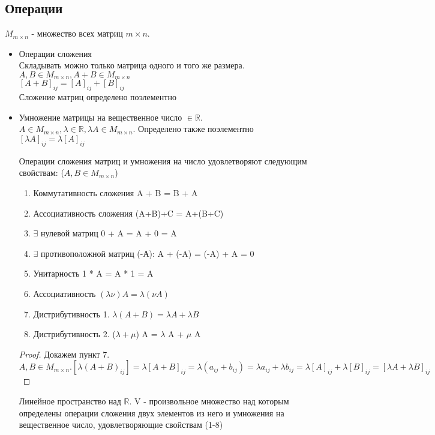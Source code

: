 	\subsection{Операции}
	\(M_{m\times n}\) - множество всех матриц \(m\times n\).
	\begin{itemize}
		\item Операции сложения \\
		Складывать можно только матрица одного и того же размера. \(A, B \in M_{m\times n}, A + B \in M_{m\times n}\)\\
		\([A+B]_{ij} = [A]_{ij}+ [B]_{ij}\)\\
		Сложение матриц определено поэлементно
		\item Умножение матрицы на вещественное число \(\in\mathbb{R}\). \(A\in M_{m\times n}, \lambda \in \mathbb{R}, \lambda A\in M_{m\times n}\). Определено также поэлементно \\
		\([\lambda A]_{ij} = \lambda[A]_{ij}\)
		\begin{theorem}
			Операции сложения матриц и умножения на число удовлетворяют следующим свойствам: (\(A, B \in M_{m\times n}\))
			\begin{enumerate}
				\item Коммутативность сложения A + B = B + A
				\item Ассоциативность сложения (A+B)+C = A+(B+C)
				\item \(\exists\) нулевой матриц 0 + A = A + 0 = A
				\item \(\exists\) противоположной матриц (-А): A + (-A) = (-A) + A = 0
				\item Унитарность 1 * A = A * 1 = A
				\item Ассоциативность \((\lambda\nu)A = \lambda(\nu A)\)
				\item Дистрибутивность 1. \(\lambda(A+B) = \lambda A + \lambda B\)
				\item Дистрибутивность 2. (\(\lambda + \mu\)) A = $\lambda$ A + $\mu$ A
			\end{enumerate}
		\end{theorem}
		\begin{proof}
			Докажем пункт 7. \(A, B \in M_{m\times n}. [\lambda (A+B)_{ij}] = \lambda [A+B]_{ij} = \lambda(a_{ij} + b_{ij}) = \lambda a_{ij} + \lambda b_{ij} = \lambda [A]_{ij} + \lambda [B]_{ij} = [\lambda A +\lambda B]_{ij}\)
		\end{proof}
		\begin{definition}
			Линейное пространство над \(\mathbb{R}\). V - произвольное множество над которым определены операции сложения двух элементов из него и умножения на вещественное число, удовлетворяющие свойствам (1-8)

\end{definition}
\end{itemize}
